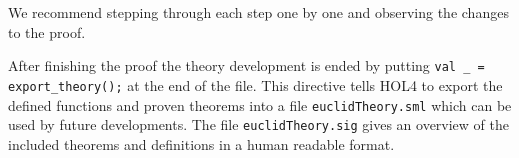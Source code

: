 We recommend stepping through each step one by one and observing the changes to
the proof.

After finishing the proof the theory development is ended by putting
\lstinline{val _ = export_theory();} at the end of the file.
This directive tells HOL4 to export the defined functions and proven theorems
into a file \texttt{euclidTheory.sml} which can be used by future developments.
The file \texttt{euclidTheory.sig} gives an overview of the included theorems and
definitions in a human readable format.
